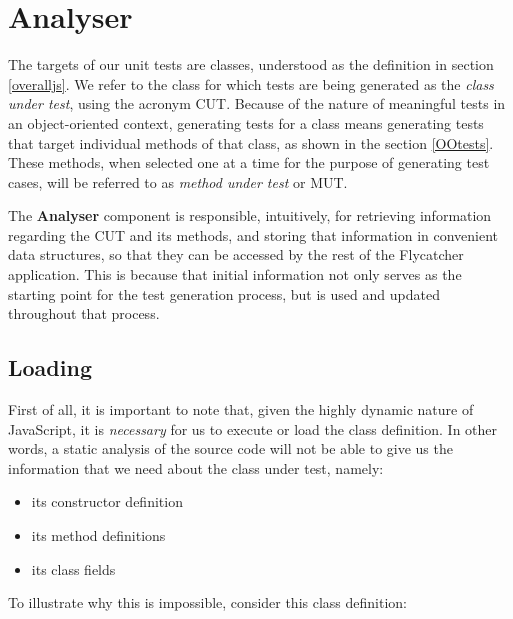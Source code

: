 \chapter{Analyser}

The targets of our unit tests are classes, understood as the definition in section \ref{overalljs}. We refer to the class for which tests are being generated as the \emph{class under test}, using the acronym CUT. Because of the nature of meaningful tests in an object-oriented context, generating tests for a class means generating tests that target individual methods of that class, as shown in the section \ref{OOtests}. These methods, when selected one at a time for the purpose of generating test cases, will be referred to as \emph{method under test} or MUT.

The \textbf{Analyser} component is responsible, intuitively, for retrieving information regarding the CUT and its methods, and storing that information in convenient data structures, so that they can be accessed by the rest of the \textsf{Flycatcher} application. This is because that initial information not only serves as the starting point for the test generation process, but is used and updated throughout that process.


\section{Loading}

First of all, it is important to note that, given the highly dynamic nature of JavaScript, it is \emph{necessary} for us to execute or load the class definition. In other words, a static analysis of the source code will not be able to give us the information that we need about the class under test, namely:

\begin{itemize}
   \item its constructor definition
   \item its method definitions
   \item its class fields
\end{itemize}

To illustrate why this is impossible, consider this class definition:

